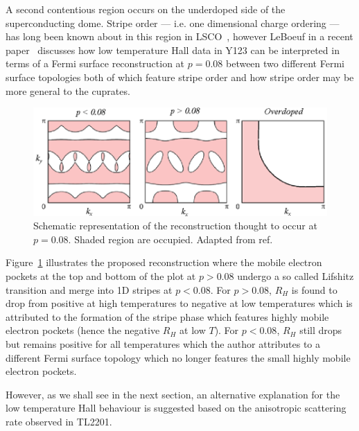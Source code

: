 A second contentious region occurs on the underdoped side of the superconducting dome. Stripe order --- i.e. one dimensional charge ordering --- has long been known about in this region in \ac{LSCO}~\cite{Kivelson2002}, however LeBoeuf \etal in a recent paper~\cite{LeBoeuf2011} discusses how low temperature Hall data in \ac{Y123} can be interpreted in terms of a Fermi surface reconstruction at $p=0.08$ between two different Fermi surface topologies both of which feature stripe order and how stripe order may be more general to the cuprates.
\begin{figure}[htbp]
    \begin{center}
        \includegraphics[scale=0.9]{Chapter-Introduction/Figures/LifshitzReconstruction/LifshitzReconstruction}
        \caption{Schematic representation of the reconstruction thought to occur at $p=0.08$. Shaded region are occupied. Adapted from ref.~\cite{Vojta2011}}
        \label{Fig:Intro:LifshitzReconstruction}
    \end{center}
\end{figure}
Figure~\ref{Fig:Intro:LifshitzReconstruction} illustrates the proposed reconstruction where the mobile electron pockets at the top and bottom of the plot at $p > 0.08$ undergo a so called Lifshitz transition and merge into 1D stripes at $p < 0.08$.  For $p > 0.08$, $R_H$ is found to drop from positive at high temperatures to negative at low temperatures which is attributed to the formation of the stripe phase which features highly mobile electron pockets (hence the negative $R_H$ at low $T$). For $p < 0.08$, $R_H$ still drops but remains positive for all temperatures which the author attributes to a different Fermi surface topology which no longer features the small highly mobile electron pockets. 

However, as we shall see in the next section, an alternative explanation for the low temperature Hall behaviour is suggested based on the anisotropic scattering rate observed in \ac{TL2201}. 






